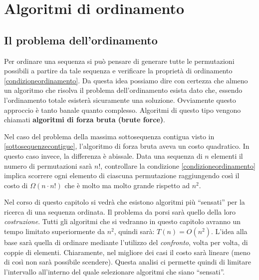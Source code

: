 \chapter{Algoritmi di ordinamento}\label{cap:ordinamento}
\section{Il problema dell'ordinamento}


Per ordinare una sequenza si può pensare di generare tutte le permutazioni possibili a partire da tale sequenza e verificare la proprietà di ordinamento \ref{condizioneordinamento}. Da questa idea possiamo dire con certezza che almeno un algoritmo che risolva il problema dell'ordinamento esista dato che, essendo l'ordinamento totale esisterà sicuramente una soluzione. Ovviamente questo approccio è tanto banale quanto complesso. Algoritmi di questo tipo vengono chiamati \textbf{algoritmi di forza bruta (brute force)}.

Nel caso del problema della massima sottosequenza contigua visto in \ref{sottosequenzecontigue}, l'algoritmo di forza bruta aveva un costo quadratico. In questo caso invece, la differenza è abissale. Data una sequenza di $n$ elementi il numero di permutazioni sarà $n!$, controllare la condizione \ref{condizioneordinamento} implica scorrere ogni elemento di ciascuna permutazione raggiungendo così il costo di $\Omega(n \cdot n!)$ che è molto ma molto grande rispetto ad $n^{2}$.

Nel corso di questo capitolo si vedrà che esistono algoritmi più ``sensati'' per la ricerca di una sequenza ordinata. Il problema da porsi sarà quello della loro \textit{costruzione}. Tutti gli algoritmi che si vedranno in questo capitolo avranno un tempo limitato superiormente da $n^{2}$, quindi sarà: $T(n)=O(n^{2})$.  L'idea alla base sarà quella di ordinare mediante l'utilizzo del \emph{confronto}, volta per volta, di coppie di elementi. Chiaramente, nel migliore dei casi il costo sarà lineare (meno di così non sarà possibile scendere). Questa analisi ci permette quindi di limitare l'intervallo all'interno del quale selezionare algoritmi  che siano ``sensati''.

